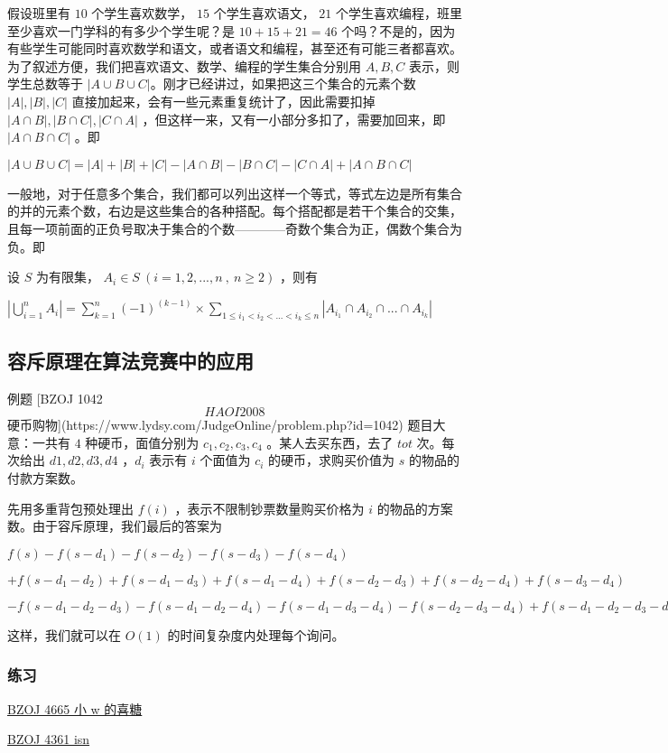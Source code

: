 
假设班里有 $10$ 个学生喜欢数学， $15$ 个学生喜欢语文， $21$ 个学生喜欢编程，班里至少喜欢一门学科的有多少个学生呢？是 $10+15+21=46$ 个吗？不是的，因为有些学生可能同时喜欢数学和语文，或者语文和编程，甚至还有可能三者都喜欢。为了叙述方便，我们把喜欢语文、数学、编程的学生集合分别用 $A,B,C$ 表示，则学生总数等于 $|A\cup B\cup C|$。刚才已经讲过，如果把这三个集合的元素个数 $|A|,|B|,|C|$ 直接加起来，会有一些元素重复统计了，因此需要扣掉 $|A\cap B|,|B\cap C|,|C\cap A|$ ，但这样一来，又有一小部分多扣了，需要加回来，即 $|A\cap B\cap C|$ 。即

$|A\cup B\cup C|=|A|+|B|+|C|-|A\cap B|-|B\cap C|-|C\cap A|+|A\cap B\cap C|$

一般地，对于任意多个集合，我们都可以列出这样一个等式，等式左边是所有集合的并的元素个数，右边是这些集合的各种搭配。每个搭配都是若干个集合的交集，且每一项前面的正负号取决于集合的个数————奇数个集合为正，偶数个集合为负。即

设 $S$ 为有限集， $A_i\in S~(i=1,2,...,n~,~n\ge 2)$ ，则有

$| \bigcup_{i=1}^n A_i | =\sum_{k=1}^n (-1)^{(k-1)} \times \sum_{1\le i_1<i_2<...<i_k\le n} |A_{i_1}\cap A_{i_2} \cap ...\cap A_{i_k}|$

\subsection{容斥原理在算法竞赛中的应用}

\begin{NOTE}{ 例题 [BZOJ 1042 \[HAOI2008\] 硬币购物](https://www.lydsy.com/JudgeOnline/problem.php?id=1042)}{}
题目大意：一共有 $4$ 种硬币，面值分别为 $c_1,c_2,c_3,c_4$ 。某人去买东西，去了 $tot$ 次。每次给出 $d1,d2,d3,d4$ ，$d_i$ 表示有 $i$ 个面值为 $c_i$ 的硬币，求购买价值为 $s$ 的物品的付款方案数。
\end{NOTE}


先用多重背包预处理出 $f(i)$ ，表示不限制钞票数量购买价格为 $i$ 的物品的方案数。由于容斥原理，我们最后的答案为

$f(s)-f(s-d_1)-f(s-d_2)-f(s-d_3)-f(s-d_4)$

$+f(s-d_1-d_2)+f(s-d_1-d_3)+f(s-d_1-d_4)+f(s-d_2-d_3)+f(s-d_2-d_4)+f(s-d_3-d_4)$

$-f(s-d_1-d_2-d_3)-f(s-d_1-d_2-d_4)-f(s-d_1-d_3-d_4)-f(s-d_2-d_3-d_4)+f(s-d_1-d_2-d_3-d_4)$

这样，我们就可以在 $O(1)$ 的时间复杂度内处理每个询问。

\subsubsection{练习}

\href{https://www.lydsy.com/JudgeOnline/problem.php?id=4665}{BZOJ 4665 小 w 的喜糖}

\href{https://www.lydsy.com/JudgeOnline/problem.php?id=4361}{BZOJ 4361 isn}
